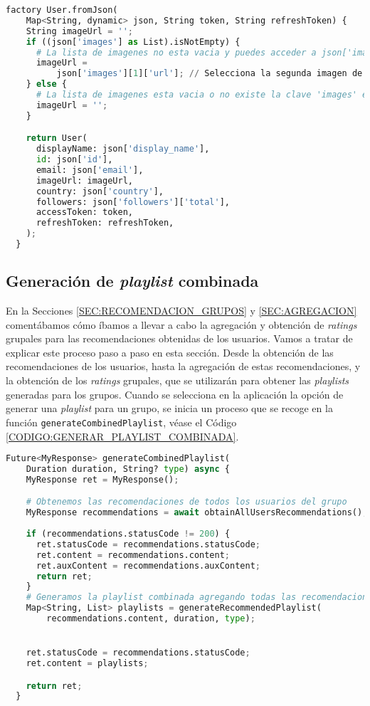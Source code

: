 \begin{lstlisting}[language=python, caption=Constructor personalizado de la clase \texttt{User}, label=CODIGO:FROM_JSON_USER]
  factory User.fromJson(
    Map<String, dynamic> json, String token, String refreshToken) {
    String imageUrl = '';
    if ((json['images'] as List).isNotEmpty) {
      # La lista de imagenes no esta vacia y puedes acceder a json['images'][0]
      imageUrl =
          json['images'][1]['url']; // Selecciona la segunda imagen de la lista
    } else {
      # La lista de imagenes esta vacia o no existe la clave 'images' en el JSON
      imageUrl = '';
    }

    return User(
      displayName: json['display_name'],
      id: json['id'],
      email: json['email'],
      imageUrl: imageUrl,
      country: json['country'],
      followers: json['followers']['total'],
      accessToken: token,
      refreshToken: refreshToken,
    );
  }
\end{lstlisting}
\subsection{Generación de \textit{playlist} combinada\label{SEC:AGREGACION_IMPLEMENTACION}}

En la Secciones \ref{SEC:RECOMENDACION_GRUPOS} y \ref{SEC:AGREGACION} comentábamos cómo íbamos a llevar a cabo la agregación y obtención 
de \textit{ratings} grupales para las recomendaciones obtenidas de los usuarios. Vamos a tratar de explicar este proceso paso a paso en esta sección.
Desde la obtención de las recomendaciones de los usuarios, hasta la agregación de estas recomendaciones, y la obtención de los \textit{ratings} grupales,
que se utilizarán para obtener las \textit{playlists} generadas para los grupos. Cuando se selecciona en la aplicación la opción de generar una 
\textit{playlist} para un grupo, se inicia un proceso que se recoge en la función \texttt{generateCombinedPlaylist}, véase el Código \ref{CODIGO:GENERAR_PLAYLIST_COMBINADA}.

\begin{lstlisting}[language=python, caption=Generar \textit{playlist} combinada, label=CODIGO:GENERAR_PLAYLIST_COMBINADA]
  Future<MyResponse> generateCombinedPlaylist(
    Duration duration, String? type) async {
    MyResponse ret = MyResponse();

    # Obtenemos las recomendaciones de todos los usuarios del grupo
    MyResponse recommendations = await obtainAllUsersRecommendations();
    
    if (recommendations.statusCode != 200) {
      ret.statusCode = recommendations.statusCode;
      ret.content = recommendations.content;
      ret.auxContent = recommendations.auxContent;
      return ret;
    }
    # Generamos la playlist combinada agregando todas las recomendaciones
    Map<String, List> playlists = generateRecommendedPlaylist(
        recommendations.content, duration, type);


    ret.statusCode = recommendations.statusCode;
    ret.content = playlists;

    return ret;
  }
\end{lstlisting}

